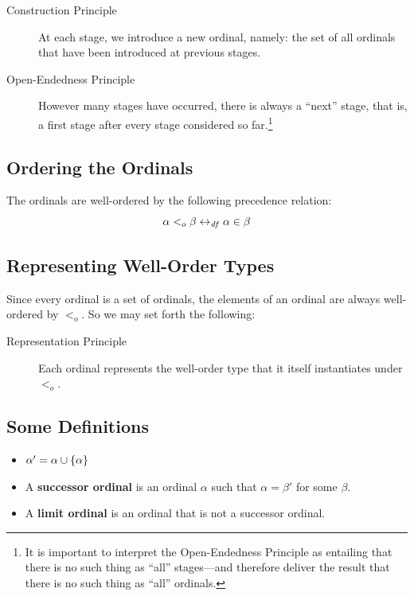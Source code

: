 \documentclass[12pt]{extarticle}
\begin{document}
 \begin{description}
\item[Construction Principle] 
At each stage, we introduce a new ordinal, namely: the set of all ordinals that have been introduced at previous stages.

\end{description}
\begin{description}
\item[Open-Endedness Principle] However many stages have occurred, there is always a ``next'' stage, that is, a first stage after every stage considered so far.\footnote{It is important to interpret the Open-Endedness Principle as entailing that there is no such thing as ``all'' stages---and therefore deliver the result that there is no such thing as ``all'' ordinals.}

\end{description}

\subsection{Ordering the Ordinals}

The ordinals are well-ordered by the following precedence relation:
$$\alpha <_o \beta \leftrightarrow_{\text{\emph{df}}} \alpha \in \beta$$



\subsection{Representing Well-Order Types}


Since every ordinal is a set of ordinals, the elements of an ordinal are always well-ordered by $<_o$. So we may set forth the following:

\begin{description}
\item[Representation Principle] 
Each ordinal represents the well-order type that it itself instantiates under $<_o$.
\end{description}

\subsection{Some Definitions}

\begin{itemize}

\item $\alpha' = \alpha \cup \left\{\alpha\right\}$

\item A \textbf{successor ordinal} is an ordinal \(\alpha\) such that \(\alpha = \beta'\) for some \(\beta\).


\item A \textbf{limit ordinal} is an ordinal that is not a successor ordinal.
\end{itemize}
\end{document}
